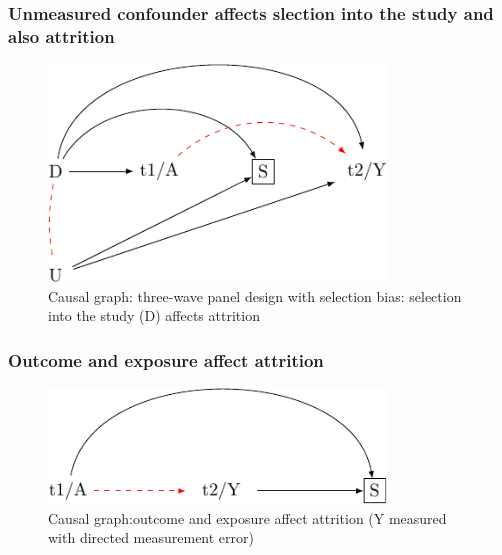 \documentclass[
  singlecolumn]{report}
\begin{document}
\hypertarget{unmeasured-confounder-affects-slection-into-the-study-and-also-attrition}{%
\subsubsection{Unmeasured confounder affects slection into the study and
also
attrition}\label{unmeasured-confounder-affects-slection-into-the-study-and-also-attrition}}

\begin{figure}

{\centering \includegraphics[width=0.8\textwidth,height=\textheight]{causal-dags_files/figure-pdf/fig-dag-8-4-1.pdf}

}

\caption{\label{fig-dag-8-4}Causal graph: three-wave panel design with
selection bias: selection into the study (D) affects attrition}

\end{figure}

\hypertarget{outcome-and-exposure-affect-attrition}{%
\subsubsection{Outcome and exposure affect
attrition}\label{outcome-and-exposure-affect-attrition}}

\begin{figure}

{\centering \includegraphics[width=0.8\textwidth,height=\textheight]{causal-dags_files/figure-pdf/fig-dag-8-5-1.pdf}

}

\caption{\label{fig-dag-8-5}Causal graph:outcome and exposure affect
attrition (Y measured with directed measurement error)}

\end{figure}
\end{document}
